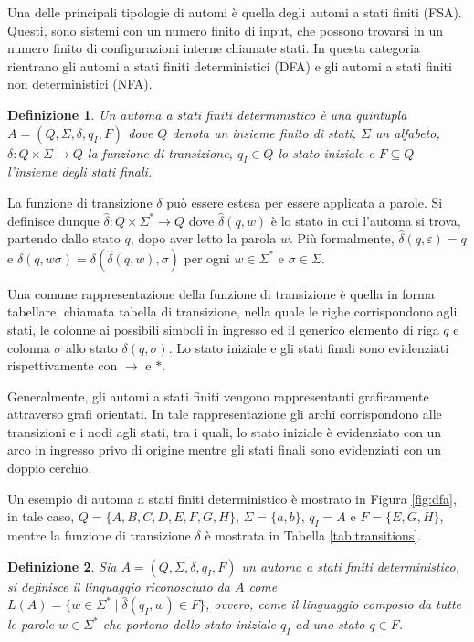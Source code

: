 \documentclass[a4paper,12pt]{report} %
\newtheorem{definition}{Definizione}[chapter] %
\begin{document}
Una delle principali tipologie di automi è quella degli automi a stati finiti (FSA). Questi, sono sistemi
con un numero finito di input, che possono trovarsi in un numero finito di configurazioni interne chiamate stati. 
In questa categoria rientrano gli automi a stati finiti deterministici (DFA) e gli automi a stati finiti 
non deterministici (NFA).

\begin{definition}
  \label{def:dfa}
  Un \emph{automa a stati finiti deterministico} è una quintupla $A = (Q, \Sigma, \delta, \allowbreak q_I, F)$
  dove $Q$ denota un insieme finito di stati, $\Sigma$ un alfabeto, $\delta: Q \times \Sigma \rightarrow Q$ 
  la funzione di transizione, $q_I \in Q$ lo stato iniziale e $F \subseteq Q$ l'insieme degli stati finali.
\end{definition}

La funzione di transizione $\delta$ può essere estesa per essere applicata a parole. Si definisce dunque
$\hat{\delta}: Q \times \Sigma^* \rightarrow Q$ dove $\hat{\delta}(q, w)$ è lo stato in cui l'automa si trova,
partendo dallo stato $q$, dopo aver letto la parola $w$. Più formalmente, $\hat{\delta}(q, \varepsilon) = q$ e
$\hat{\delta}(q, w\sigma) = \delta(\hat{\delta}(q, w), \sigma)$ per ogni $w \in \Sigma^*$ e $\sigma \in \Sigma$.

Una comune rappresentazione della funzione di transizione è quella in forma tabellare, chiamata tabella di transizione,
nella quale le righe corrispondono agli stati, le colonne ai possibili simboli in ingresso ed il generico elemento
di riga $q$ e colonna $\sigma$ allo stato $\delta(q, \sigma)$. Lo stato iniziale e gli stati finali sono evidenziati
rispettivamente con $\rightarrow$ e $*$.

Generalmente, gli automi a stati finiti vengono rappresentanti graficamente attraverso grafi orientati.
In tale rappresentazione gli archi corrispondono alle transizioni e i nodi agli stati, tra i quali, lo stato iniziale è
evidenziato con un arco in ingresso privo di origine mentre gli stati finali sono evidenziati con un doppio cerchio.

Un esempio di automa a stati finiti deterministico è mostrato in Figura \ref{fig:dfa}, in tale caso,
$Q = \{A, B, C, D, E, F, G, H\}$, $\Sigma = \{a, b\}$, $q_I = A$ e $F = \{E, G, H\}$, mentre
la funzione di transizione $\delta$ è mostrata in Tabella \ref{tab:transitions}.

\begin{definition}
  \label{def:reg-lang}
  Sia $A = (Q, \Sigma, \delta, q_I, F)$ un automa a stati finiti deterministico, si definisce il \emph{linguaggio
  riconosciuto} da $A$ come $L(A) = \{w \in \Sigma^* \mid \hat{\delta}(q_I, w) \in F\}$, ovvero, come
  il linguaggio composto da tutte le parole $w \in \Sigma^*$ che portano dallo stato iniziale $q_I$ ad
  uno stato $q \in F$.
\end{definition}
\end{document}
